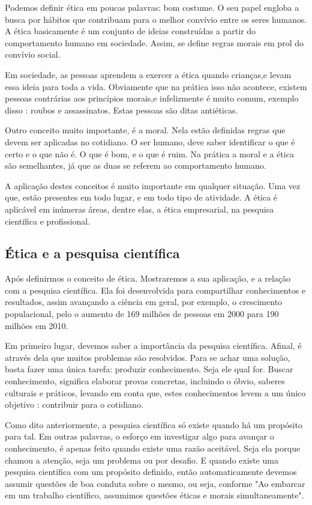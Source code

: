 \documentclass[12pt]{article}
\begin{document}
Podemos definir ética em poucas palavras: bom costume. O seu papel engloba a busca por hábitos que contribuam para o melhor convívio entre os seres humanos. A ética basicamente é um conjunto de ideias construídas a partir do comportamento humano em sociedade. Assim, se define regras morais em prol do convívio social.

Em sociedade, as pessoas aprendem a exercer a ética quando crianças,e levam essa ideia para toda a vida. Obviamente que na prática isso não acontece, existem pessoas contrárias aos princípios morais,e infelizmente é muito comum, exemplo disso : roubos e assassinatos. Estas pessoas são ditas antiéticas.

Outro conceito muito importante, é a moral. Nela estão definidas regras que devem ser aplicadas no cotidiano. O ser humano, deve saber identificar o que é certo e o que não é. O que é bom, e o que é ruim. Na prática a moral e a ética são semelhantes, já que as duas se referem ao comportamento humano.

A aplicação destes conceitos é muito importante em qualquer situação. Uma vez que, estão presentes em todo lugar, e em todo tipo de atividade. A ética é aplicável em inúmeras áreas, dentre elas, a ética empresarial, na pesquisa científica e profissional.


\subsection{Ética e a pesquisa científica} \label{sec:sub1}

Após definirmos o conceito de ética. Mostraremos a sua aplicação, e a relação com a pesquisa científica. Ela foi desenvolvida para compartilhar 
conhecimentos e resultados, assim avançando a ciência 
em geral, por exemplo, o crescimento 
populacional, pelo o aumento de 169 milhões de pessoas 
em 2000\cite{censo:00} para 190 milhões em 2010\cite{censo:10}.

Em primeiro lugar, devemos saber a importância da pesquisa científica. Afinal, é através dela que muitos problemas são resolvidos. Para se achar uma solução, basta fazer uma única tarefa: produzir conhecimento. Seja ele qual for. Buscar conhecimento, significa elaborar provas concretas, incluindo o óbvio, saberes culturais e práticos, levando em conta que, estes conhecimentos levem a um único objetivo : contribuir para o cotidiano.

Como dito anteriormente, a pesquisa científica só existe quando há um propósito para tal. Em outras palavras, o esforço em investigar algo para avançar o conhecimento, é apenas feito quando existe uma razão aceitável. Seja ela porque chamou a atenção, seja um problema ou por desafio. E quando existe uma pesquisa científica com um propósito definido, então automaticamente devemos assumir questões de boa conduta sobre o mesmo, ou seja, conforme \cite{PETER} "Ao embarcar em um trabalho científico, assumimos questões éticas e morais simultaneamente".
\end{document}
